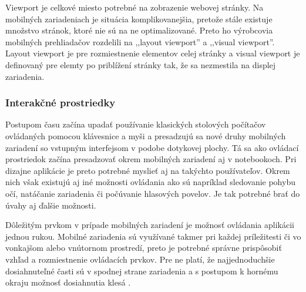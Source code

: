 Viewport je celkové miesto potrebné na zobrazenie webovej stránky. Na mobilných zariadeniach je situácia komplikovanejšia, pretože stále existuje množstvo stránok, ktoré nie sú na ne optimalizované. Preto ho výrobcovia mobilných prehliadačov rozdelili na ,,layout viewport'' a ,,visual viewport''. \cite{pixelnotpixel} Layout viewport je pre rozmiestnenie elementov celej stránky a visual viewport je definovaný pre elemty po priblížení stránky tak, že sa nezmestila na displej zariadenia.


\subsubsection{Interakčné prostriedky} %
\label{ssub:interak_n_prostriedky}

Postupom času začína upadať používanie klasických stolových počítačov ovládaných pomocou klávesnice a myši a presadzujú sa nové druhy mobilných zariadení so vstupným interfejsom v podobe dotykovej plochy. Tá sa ako ovládací prostriedok začína presadzovať okrem mobilných zariadení aj v notebookoch. Pri dizajne aplikácie je preto potrebné myslieť aj na takýchto používateľov. Okrem nich však existujú aj iné možnosti ovládania ako sú napríklad sledovanie pohybu očí, natáčanie zariadenia či počúvanie hlasových povelov. Je tak potrebné brať do úvahy aj ďalšie možnosti.

Dôležitým prvkom v prípade mobilných zariadení je možnosť ovládania aplikácii jednou rukou. Mobilné zariadenia sú využívané takmer pri každej príležitesti či vo vonkajšom alebo vnútornom prostredí, preto je potrebné správne prispôsobiť vzhľad a rozmiestnenie ovládacích prvkov. Pre ne platí, že najjednoduchšie dosiahnuteľné časti sú v spodnej strane zariadenia a s postupom k hornému okraju možnosť dosiahnutia klesá \cite{mobilebooktouch}.


